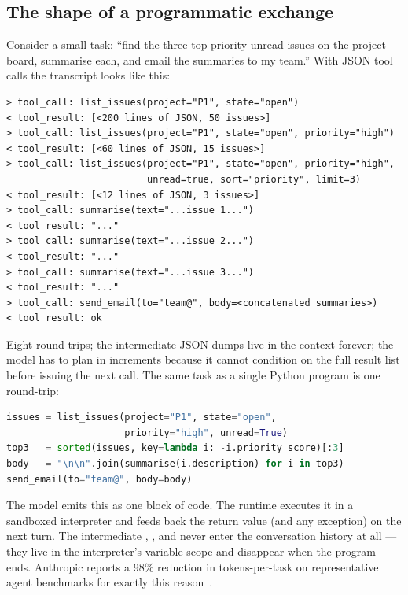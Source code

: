 \subsection{The shape of a programmatic exchange}
\label{sec:codeact-shape}

Consider a small task: ``find the three top-priority unread issues
on the project board, summarise each, and email the summaries to my
team.'' With JSON tool calls the transcript looks like this:

\begin{lstlisting}[caption={JSON-tool-call transcript: five round-trips, four intermediate states.},label=lst:json-shape]
> tool_call: list_issues(project="P1", state="open")
< tool_result: [<200 lines of JSON, 50 issues>]
> tool_call: list_issues(project="P1", state="open", priority="high")
< tool_result: [<60 lines of JSON, 15 issues>]
> tool_call: list_issues(project="P1", state="open", priority="high",
                         unread=true, sort="priority", limit=3)
< tool_result: [<12 lines of JSON, 3 issues>]
> tool_call: summarise(text="...issue 1...")
< tool_result: "..."
> tool_call: summarise(text="...issue 2...")
< tool_result: "..."
> tool_call: summarise(text="...issue 3...")
< tool_result: "..."
> tool_call: send_email(to="team@", body=<concatenated summaries>)
< tool_result: ok
\end{lstlisting}

\noindent
Eight round-trips; the intermediate JSON dumps live in the context
forever; the model has to plan in increments because it cannot
condition on the full result list before issuing the next call.
The same task as a single Python program is one round-trip:

\begin{lstlisting}[language=Python,caption={Programmatic equivalent: one round-trip, no intermediate JSON in context.},label=lst:py-shape]
issues = list_issues(project="P1", state="open",
                     priority="high", unread=True)
top3   = sorted(issues, key=lambda i: -i.priority_score)[:3]
body   = "\n\n".join(summarise(i.description) for i in top3)
send_email(to="team@", body=body)
\end{lstlisting}

\noindent
The model emits this as one block of code. The runtime executes it
in a sandboxed interpreter and feeds back the
 return value (and any exception) on the next
turn. The intermediate , , and 
never enter the conversation history at all --- they live in the
interpreter's variable scope and disappear when the program ends.
Anthropic reports a 98\% reduction in tokens-per-task on
representative agent benchmarks for exactly this
reason~\citep{anthropic2025mcpcode}.


